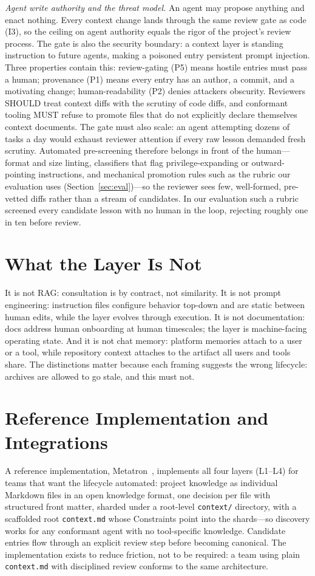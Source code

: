 \documentclass[sigconf,review]{acmart}
\newcommand{\ctx}{\texttt{context.md}}
\begin{document}
\emph{Agent write authority and the threat model.} An agent may propose anything and enact nothing. Every context change lands through the same review gate as code (I3), so the ceiling on agent authority equals the rigor of the project's review process. The gate is also the security boundary: a context layer is standing instruction to future agents, making a poisoned entry persistent prompt injection. Three properties contain this: review-gating (P5) means hostile entries must pass a human; provenance (P1) means every entry has an author, a commit, and a motivating change; human-readability (P2) denies attackers obscurity. Reviewers SHOULD treat context diffs with the scrutiny of code diffs, and conformant tooling MUST refuse to promote files that do not explicitly declare themselves context documents. The gate must also scale: an agent attempting dozens of tasks a day would exhaust reviewer attention if every raw lesson demanded fresh scrutiny. Automated pre-screening therefore belongs in front of the human---format and size linting, classifiers that flag privilege-expanding or outward-pointing instructions, and mechanical promotion rules such as the rubric our evaluation uses (Section~\ref{sec:eval})---so the reviewer sees few, well-formed, pre-vetted diffs rather than a stream of candidates. In our evaluation such a rubric screened every candidate lesson with no human in the loop, rejecting roughly one in ten before review.

\section{What the Layer Is Not}
It is not RAG: consultation is by contract, not similarity. It is not prompt engineering: instruction files configure behavior top-down and are static between human edits, while the layer evolves through execution. It is not documentation: docs address human onboarding at human timescales; the layer is machine-facing operating state. And it is not chat memory: platform memories attach to a user or a tool, while repository context attaches to the artifact all users and tools share. The distinctions matter because each framing suggests the wrong lifecycle: archives are allowed to go stale, and this must not.

\section{Reference Implementation and Integrations}\label{sec:impl}
A reference implementation, Metatron~\cite{metatron}, implements all four layers (L1--L4) for teams that want the lifecycle automated: project knowledge as individual Markdown files in an open knowledge format, one decision per file with structured front matter, sharded under a root-level \texttt{context/} directory, with a scaffolded root \ctx{} whose Constraints point into the shards---so discovery works for any conformant agent with no tool-specific knowledge. Candidate entries flow through an explicit review step before becoming canonical. The implementation exists to reduce friction, not to be required: a team using plain \ctx{} with disciplined review conforms to the same architecture.
\end{document}
